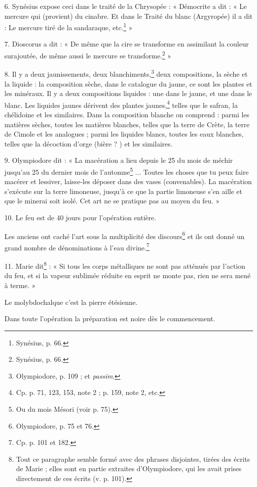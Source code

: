 \documentclass[landscape, a4paper, 11pt, oneside, polutonikogreek, french]{article}
\begin{document}
6. Synésius expose ceci dans le traité de la Chrysopée : « Démocrite a dit : « Le mercure qui (provient) du cinabre. Et dans le Traité du blanc (Argyropée) il a dit : Le mercure tiré de la sandaraque, etc.\footnote{Synésius, p. 66.} »

7. Dioscorus a dit : « De même que la cire se transforme en assimilant la couleur surajoutée, de même aussi le mercure se transforme.\footnote{Synésius, p. 66.} »

8. Il y a deux jaunissements, deux blanchiments,\footnote{Olympiodore, p. 109 ; et \emph{passim}.} deux compositions, la sèche et la liquide : la composition sèche, dans le catalogue du jaune, ce sont les plantes et les minéraux. Il y a deux compositions liquides : une dans le jaune, et une dans le blanc. Les liquides jaunes dérivent des plantes jaunes,\footnote{Cp. p. 71, 123, 153, note 2 ; p. 159, note 2, etc.} telles que le safran, la chélidoine et les similaires. Dans la composition blanche on comprend : parmi les matières sèches, toutes les matières blanches, telles que la terre de Crète, la terre de Cimole et les analogues ; parmi les liquides blancs, toutes les eaux blanches, telles que la décoction d'orge (bière ? ) et les similaires.

9. Olympiodore dit : « La macération a lieu depuis le 25 du mois de méchir jusqu'au 25 du dernier mois de l'automne\footnote{Ou du mois Mésori (voir p. 75).} ... Toutes les choses que tu peux faire macérer et lessiver, laisse-les déposer dans des vases (convenables). La macération s'exécute sur la terre limoneuse, jusqu'à ce que la partie limoneuse s'en aille et que le minerai soit isolé. Cet art ne se pratique pas au moyen du feu. »

10. Le feu est de 40 jours pour l'opération entière.

Les anciens ont caché l'art sous la multiplicité des discours\footnote{Olympiodore, p. 75 et 76.} et ils ont donné un grand nombre de dénominations à l'eau divine.\footnote{Cp. p. 101 et 182.}

11. Marie dit\footnote{Tout ce paragraphe semble formé avec des phrases disjointes, tirées des écrits de Marie ; elles sont en partie extraites d'Olympiodore, qui les avait prises directement de ces écrits (v. p. 101).} : « Si tous les corps métalliques ne sont pas atténués par l'action du feu, et si la vapeur sublimée réduite en esprit ne monte pas, rien ne sera mené à terme. »

Le molybdochalque c'est la pierre étésienne.

Dans toute l'opération la préparation est noire dès le commencement.
\end{document}
